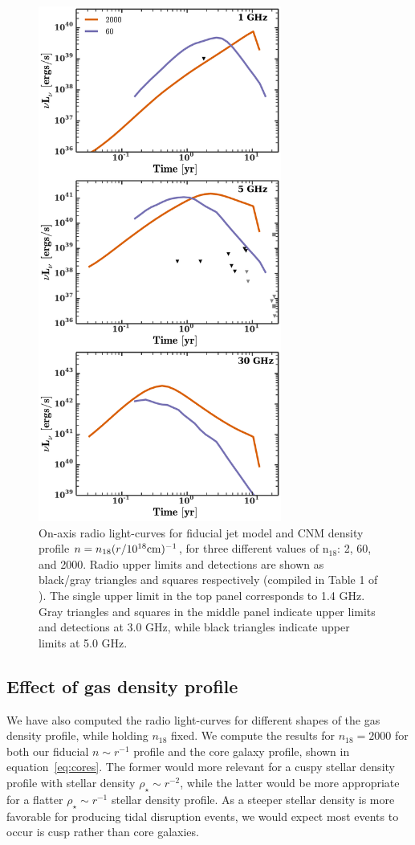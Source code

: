 \documentclass[usenatbib,fleqn]{mnras}
\begin{document}
\begin{figure} 
  \includegraphics[width=8cm]{lightcurves.pdf}
  \caption{\label{fig:upper_limits} On-axis radio light-curves for
    fiducial jet model and CNM density profile $n=n_{18} (r/10^{18}
    {\rm cm})^{-1}$, for three different values of n$_{18}$: 2, 60,
    and 2000. Radio upper limits and detections are shown as
    black/gray triangles and squares respectively (compiled in Table 1
    of \citealt{Mimica+2015}). The single upper limit in the top panel
    corresponds to 1.4 GHz. Gray triangles and squares in the middle
    panel indicate upper limits and detections at 3.0 GHz, while black
    triangles indicate upper limits at 5.0 GHz.}
\end{figure}

\subsection{Effect of gas density profile}
We have also computed the radio light-curves for different shapes of
the gas density profile, while holding $n_{18}$ fixed. We compute the
results for $n_{18}=2000$ for both our fiducial $n\sim r^{-1}$ profile and
the core galaxy profile, shown in equation~\eqref{eq:cores}. The
former would more relevant for a cuspy stellar density profile with
stellar density $\rho_{\star}\sim r^{-2}$, while the latter would be more
appropriate for a flatter $\rho_{\star}\sim r^{-1}$ stellar density
profile. As a steeper stellar density is more favorable for producing
tidal disruption events, we would expect most events to occur is cusp
rather than core galaxies.
\end{document}
